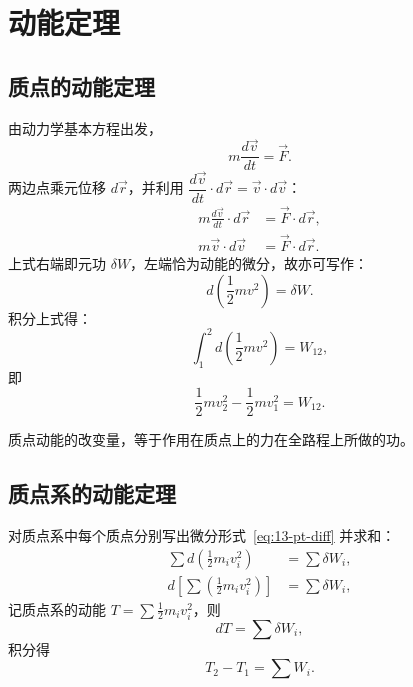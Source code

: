 \section{动能定理}

\subsection{质点的动能定理}

由动力学基本方程出发，
\begin{equation}\label{eq:13-pt-newton}
  m\frac{d\vec{v}}{dt}=\vec{F}.
\end{equation}
两边点乘元位移 $d\vec{r}$，并利用 $\dfrac{d\vec{v}}{dt}\cdot d\vec{r}=\vec{v}\cdot d\vec{v}$：
\begin{equation}\label{eq:13-pt-dot}
\begin{aligned}
  m\frac{d\vec{v}}{dt}\cdot d\vec{r}&=\vec{F}\cdot d\vec{r},\\
  m\vec{v}\cdot d\vec{v}&=\vec{F}\cdot d\vec{r}.
\end{aligned}
\end{equation}
上式右端即元功 $\delta W$，左端恰为动能的微分，故亦可写作：
\begin{equation}\label{eq:13-pt-diff}
  d\left(\frac{1}{2}mv^2\right)=\delta W .
\end{equation}
积分上式得：
\begin{equation}\label{eq:13-pt-integral}
  \int_1^2 d\left(\frac{1}{2}mv^2\right)=W_{12},
\end{equation}
即
\begin{equation}\label{eq:13-pt-result}
  \frac{1}{2}mv_2^2-\frac{1}{2}mv_1^2=W_{12}.
\end{equation}

\begin{theorem}[质点的动能定理]
质点动能的改变量，等于作用在质点上的力在全路程上所做的功。
\end{theorem}

\subsection{质点系的动能定理}

对质点系中每个质点分别写出微分形式~\eqref{eq:13-pt-diff} 并求和：
\begin{equation}\label{eq:13-sys-sum}
\begin{aligned}
  \sum d\left(\frac{1}{2}m_iv_i^2\right)&=\sum\delta W_i,\\
  d\left[\sum\left(\frac{1}{2}m_iv_i^2\right)\right]&=\sum\delta W_i,
\end{aligned}
\end{equation}
记质点系的动能 $T=\sum\tfrac{1}{2}m_iv_i^2$，则
\begin{equation}\label{eq:13-sys-diff}
  dT=\sum\delta W_i ,
\end{equation}
积分得
\begin{equation}\label{eq:13-sys-result}
  T_2-T_1=\sum W_i .
\end{equation}

